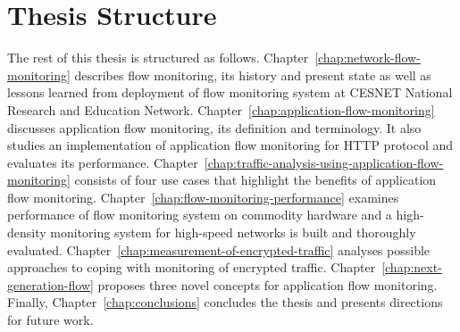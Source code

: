 \section{Thesis Structure}

The rest of this thesis is structured as follows. Chapter~\ref{chap:network-flow-monitoring} describes flow monitoring, its history and present state as well as lessons learned from deployment of flow monitoring system at CESNET National Research and Education Network. Chapter~\ref{chap:application-flow-monitoring} discusses application flow monitoring, its definition and terminology.  It also studies an implementation of application flow monitoring for HTTP protocol and evaluates its performance. Chapter~\ref{chap:traffic-analysis-using-application-flow-monitoring} consists of four use cases that highlight the benefits of application flow monitoring. Chapter~\ref{chap:flow-monitoring-performance} examines performance of flow monitoring system on commodity hardware and a high-density monitoring system for high-speed networks is built and thoroughly evaluated. Chapter~\ref{chap:measurement-of-encrypted-traffic} analyses possible approaches to coping with monitoring of encrypted traffic. Chapter~\ref{chap:next-generation-flow} proposes three novel concepts for application flow monitoring. Finally, Chapter~\ref{chap:conclusions} concludes the thesis and presents directions for future work.